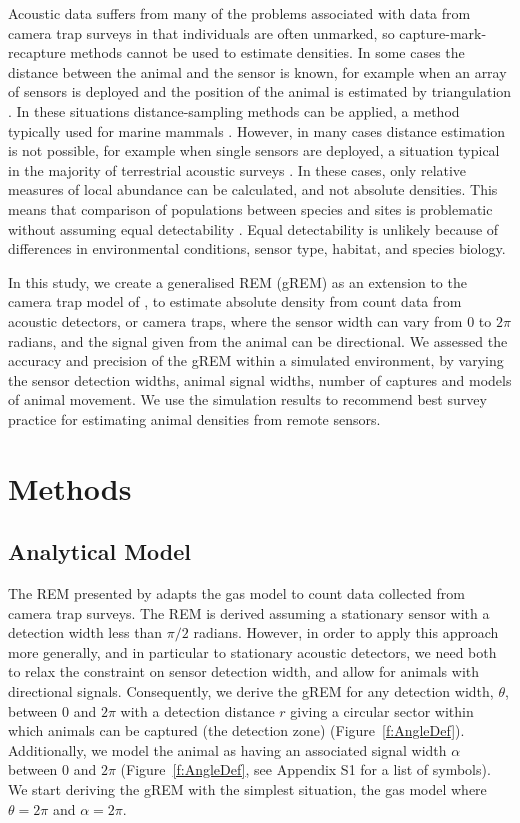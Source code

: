 \documentclass[a4paper,10pt,reqno,oneside]{amsart}
\begin{document}
Acoustic data suffers from many of the problems associated with data from camera trap surveys in that individuals are often unmarked, so capture-mark-recapture methods cannot be used to estimate densities. In some cases the distance between the animal and the sensor is known, for example when an array of sensors is deployed and the position of the animal is estimated by triangulation \citep{lewis2007sperm}. In these situations distance-sampling methods can be applied, a method typically used for marine mammals \citep{rogers2013density}. However, in many cases distance estimation is not possible, for example when single sensors are deployed, a situation typical in the majority of terrestrial acoustic surveys  \citep{elphick2008you, buckland2008estimating}. In these cases, only relative measures of local abundance can be calculated, and not absolute densities. This means that comparison of populations between species and sites is problematic without assuming equal detectability \citep{hayes2000assumptions, schmidt2003count, walters2013challenges}. Equal detectability is unlikely because of differences in environmental conditions, sensor type, habitat, and species biology. 

In this study, we create a generalised REM (gREM) as an extension to the camera trap model of \citet{rowcliffe2008estimating}, to estimate absolute density from count data from acoustic detectors, or camera traps, where the sensor width can vary from 0 to $2\pi$ radians, and the signal given from the animal can be directional. We assessed the accuracy and precision of the gREM within a simulated environment, by varying the sensor detection widths, animal signal widths, number of captures and models of animal movement. We use the simulation results to recommend best survey practice for estimating animal densities from remote sensors. 

\section*{Methods}

\subsection*{Analytical Model}

The REM presented by \citet{rowcliffe2008estimating} adapts the gas model to count data collected from camera trap surveys. The REM is derived assuming a stationary sensor with a detection width less than $\pi/2$ radians. However, in order to apply this approach more generally, and in particular to stationary acoustic detectors, we need both to relax the constraint on sensor detection width, and allow for animals with directional signals. Consequently, we derive the gREM for any detection width, $ \theta$, between 0 and $2\pi$ with a detection distance $r$ giving a circular sector within which animals can be captured (the detection zone) (Figure~\ref{f:AngleDef}). Additionally, we model the animal as having an associated signal width $\alpha$ between 0 and $2\pi$  (Figure~\ref{f:AngleDef}, see Appendix S1 for a list of symbols). We start deriving the gREM with the simplest situation, the gas model where $\theta =  2\pi$ and $ \alpha =  2\pi$. 
\end{document}
